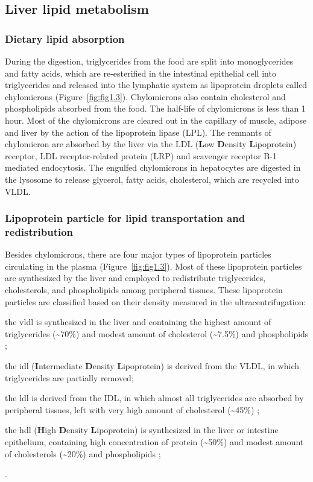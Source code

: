 \subsection{Liver lipid metabolism}

\subsubsection{Dietary lipid absorption}

During the digestion, triglycerides from the food are split into monoglycerides and fatty acids, which are re-esterified in the intestinal epithelial cell into triglycerides and released into the lymphatic system as lipoprotein droplets called chylomicrons (Figure~\ref{fig:fig1.3}). Chylomicrons also contain cholesterol and phospholipids absorbed from the food. The half-life of chylomicrons is less than 1 hour. Most of the chylomicrons are cleared out in the capillary of muscle, adipose and liver by the action of the lipoprotein lipase (LPL). The remnants of chylomicron are absorbed by the liver via the LDL (\textbf{L}ow \textbf{D}ensity \textbf{L}ipoprotein) receptor, LDL receptor-related protein (LRP) and scavenger receptor B-1 mediated endocytosis. The engulfed chylomicrons in hepatocytes are digested in the lysosome to release glycerol, fatty acids, cholesterol, which are recycled into VLDL.



\subsubsection{Lipoprotein particle for lipid transportation and redistribution}

Besides chylomicrons, there are four major types of lipoprotein particles circulating in the plasma (Figure~\ref{fig:fig1.3}). Most of these lipoprotein particles are synthesized by the liver and employed to redistribute triglycerides, cholesterols, and phospholipids among peripheral tissues. These lipoprotein particles are classified based on their density measured in the ultracentrifugation:
\begin{inparaenum}[(1)]
\item the \gls{vldl} is synthesized in the liver and containing the highest amount of triglycerides (\textasciitilde70\%) and modest amount of cholesterol (\textasciitilde7.5\%) and phospholipids \cite{ginsberg_regulation_2005};
\item the \gls{idl} (\textbf{I}ntermediate \textbf{D}ensity \textbf{L}ipoprotein) is derived from the VLDL, in which triglycerides are partially removed;
\item the \gls{ldl} is derived from the IDL, in which almost all triglycerides are absorbed by peripheral tissues, left with very high amount of cholesterol (\textasciitilde45\%) \cite{ginsberg_regulation_2005};
\item the \gls{hdl} (\textbf{H}igh \textbf{D}ensity \textbf{L}ipoprotein) is synthesized in the liver or intestine epithelium, containing high concentration of protein (\textasciitilde50\%) and modest amount of cholesterols (\textasciitilde20\%) and phospholipids \cite{ginsberg_regulation_2005};
\end{inparaenum}.

